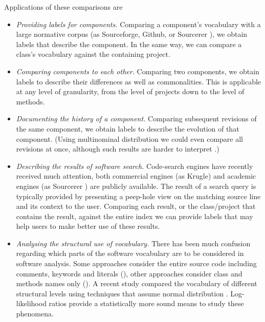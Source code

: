 Applications of these comparisons are
\begin{itemize}
\item \emph{Providing labels for components.} Comparing a component's vocabulary with a large normative corpus (as \eg Sourceforge, Github, or Sourcerer \cite{Bajrach09SUITE}), we obtain labels that describe the component. In the same way, we can compare a class's vocabulary against the containing project.
\item \emph{Comparing components to each other.} Comparing two components, we obtain labels to describe their differences as well as commonalities. This is applicable at any level of granularity, from the level of projects down to the level of methods.
\item \emph{Documenting the history of a component.} Comparing subsequent revisions of the same component, we obtain labels to describe the evolution of that component. (Using multinominal distribution we could even compare all revisions at once, although such results are harder to interpret \cite{Dunning}.)
\item \emph{Describing the results of software search.} Code-search engines have recently received much attention, both commercial engines (as \eg Krugle) and academic engines (as \eg Sourcerer \cite{Bajrach09SUITE}) are publicly available. The result of a search query is typically provided by presenting a peep-hole view on the matching source line and its context to the user. Comparing each result, or the class/project that contains the result, against the entire index we can provide labels that may help users to make better use of these results.
\item \emph{Analysing the structural use of vocabulary.} There has been much confusion regarding which parts of the software vocabulary are to be considered in software analysis. Some approaches consider the entire source code including comments, keywords and literals (\eg \cite{Kuhn08b,Kuhn07a}), other approaches consider class and methods names only (\eg \cite{Bald08a,EinarHoest}). A recent study compared the vocabulary of different structural levels using techniques that assume normal distribution \cite{Linstead09SUITE}. Log-likelihood ratios provide a statistically more sound means to study these phenomena.
\end{itemize}


